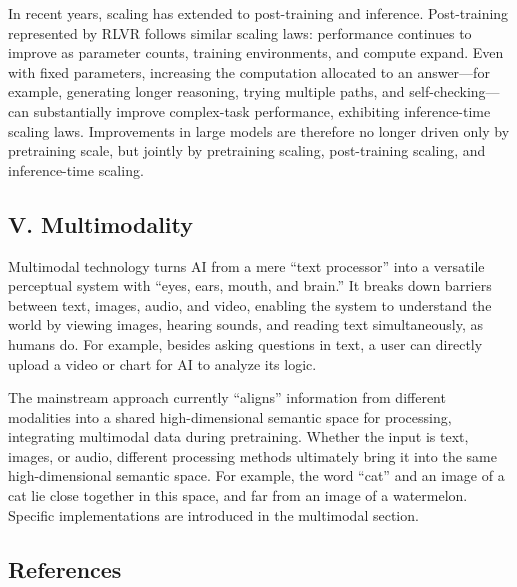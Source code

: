 In recent years, scaling has extended to post-training and inference. Post-training represented by RLVR follows similar scaling laws: performance continues to improve as parameter counts, training environments, and compute expand. Even with fixed parameters, increasing the computation allocated to an answer---for example, generating longer reasoning, trying multiple paths, and self-checking---can substantially improve complex-task performance, exhibiting inference-time scaling laws. Improvements in large models are therefore no longer driven only by pretraining scale, but jointly by pretraining scaling, post-training scaling, and inference-time scaling.

\hypertarget{v.-multimodality}{%
\subsection{V. Multimodality}\label{v.-multimodality}}

Multimodal technology turns AI from a mere ``text processor'' into a versatile perceptual system with ``eyes, ears, mouth, and brain.'' It breaks down barriers between text, images, audio, and video, enabling the system to understand the world by viewing images, hearing sounds, and reading text simultaneously, as humans do. For example, besides asking questions in text, a user can directly upload a video or chart for AI to analyze its logic.

The mainstream approach currently ``aligns'' information from different modalities into a shared high-dimensional semantic space for processing, integrating multimodal data during pretraining. Whether the input is text, images, or audio, different processing methods ultimately bring it into the same high-dimensional semantic space. For example, the word ``cat'' and an image of a cat lie close together in this space, and far from an image of a watermelon. Specific implementations are introduced in the multimodal section.

\FloatBarrier
{}
\hypertarget{references-73}{%
\subsection{References}\label{references-73}}

